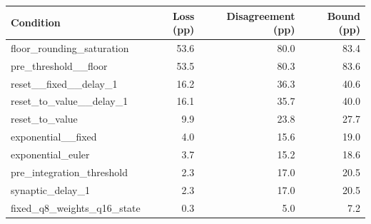 \begin{tabular}{lrrr}
\toprule
Condition & Loss (pp) & Disagreement (pp) & Bound (pp) \\
\midrule
floor\_rounding\_saturation & 53.6 & 80.0 & 83.4 \\
pre\_threshold\_\_floor & 53.5 & 80.3 & 83.6 \\
reset\_\_fixed\_\_delay\_1 & 16.2 & 36.3 & 40.6 \\
reset\_to\_value\_\_delay\_1 & 16.1 & 35.7 & 40.0 \\
reset\_to\_value & 9.9 & 23.8 & 27.7 \\
exponential\_\_fixed & 4.0 & 15.6 & 19.0 \\
exponential\_euler & 3.7 & 15.2 & 18.6 \\
pre\_integration\_threshold & 2.3 & 17.0 & 20.5 \\
synaptic\_delay\_1 & 2.3 & 17.0 & 20.5 \\
fixed\_q8\_weights\_q16\_state & 0.3 & 5.0 & 7.2 \\
\bottomrule
\end{tabular}
